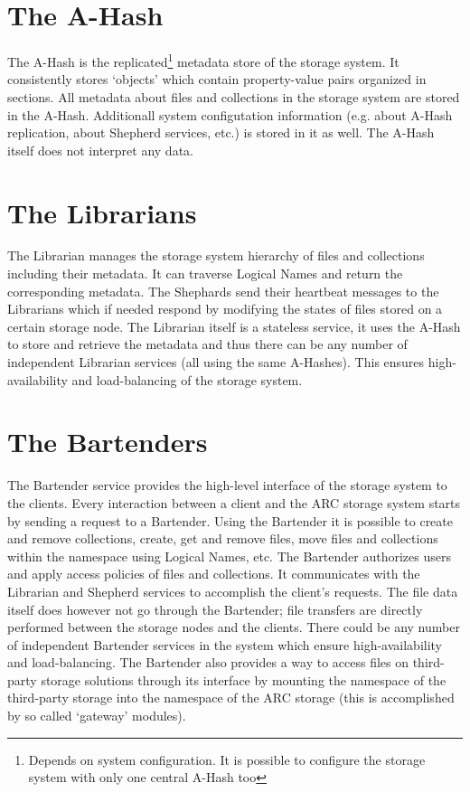\documentclass{book}
\begin{document}

\section{The A-Hash} %
\label{sec:the_a_hash}

The A-Hash is the replicated\footnote{Depends on system configuration. It is possible to configure the storage system with only one central A-Hash too} metadata store of the storage system. It consistently stores `objects' which contain property-value pairs organized in sections. All metadata about files and collections in the storage system are stored in the A-Hash. Additionall system configutation information (e.g. about A-Hash replication, about Shepherd services, etc.) is stored in it as well. The A-Hash itself does not interpret any data.


\section{The Librarians} %
\label{sec:the_librarians}

The Librarian manages the storage system hierarchy of files and collections including their metadata. It can traverse Logical Names and return the corresponding metadata. The Shephards send their heartbeat messages to the Librarians which if needed respond by modifying the states of files stored on a certain storage node. The Librarian itself is a stateless service, it uses the A-Hash to store and retrieve the metadata and thus there can be any number of independent Librarian services (all using the same A-Hashes). This ensures high-availability and load-balancing of the storage system.


\section{The Bartenders} %
\label{sec:the_bartenders}

The Bartender service provides the high-level interface of the storage system to the clients. Every interaction between a client and the ARC storage system starts by sending a request to a Bartender. Using the Bartender it is possible to create and remove collections, create, get and remove files, move files and collections within the namespace using Logical Names, etc. The Bartender authorizes users and apply access policies of files and collections. It communicates with the Librarian and Shepherd services to accomplish the client’s requests. The file data itself does however not go through the Bartender; file transfers are directly performed between the storage nodes and the clients. There could be any number of independent Bartender services in the system which ensure high-availability and load-balancing. The Bartender also provides a way to access files on third-party storage solutions through its interface by mounting the namespace of the third-party storage into the namespace of the ARC storage (this is accomplished by so called `gateway' modules). 
\end{document}
